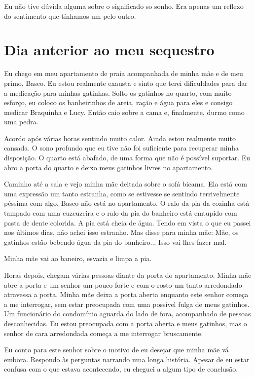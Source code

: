 \documentclass[11pt]{book}
\begin{document}
Eu não tive dúvida alguma sobre o significado so sonho. Era apenas um reflexo do sentimento que tínhamos um pelo outro.

\chapter{Dia anterior ao meu sequestro}

Eu chego em meu apartamento de praia acompanhada de minha mãe e de meu primo, Basco. Eu estou realmente exausta e sinto que terei dificuldades para dar a medicação para minhas gatinhas. Solto os gatinhos no quarto, com muito esforço, eu coloco os banheirinhos de areia, ração e água para eles e consigo medicar Braquinha e Lucy. Então caio sobre a cama e, finalmente, durmo como uma pedra.

Acordo após várias horas sentindo muito calor. Ainda estou realmente muito cansada. O sono profundo que eu tive não foi suficiente para recuperar minha disposição. O quarto está abafado, de uma forma que não é possível suportar. Eu abro a porta do quarto e deixo meus gatinhos livres no apartamento. 

Caminho até a sala e vejo minha mãe deitada sobre o sofá bicama. Ela está com uma expressão um tanto estranha, como se estivesse se sentindo terrivelmente péssima com algo. Basco não está no apartamento. O ralo da pia da cozinha está tampado com uma cuzcuzeira e o ralo da pia do banheiro está emtupido com pasta de dente colorida. A pia está cheia de água. Tendo em vista o que eu passei nos últimos dias, não achei isso estranho. Mas disse para minha mãe: Mãe, os gatinhos estão bebendo água da pia do banheiro... Isso vai lhes fazer mal. 

Minha mãe vai ao baneiro, esvazia e limpa a pia.

Horas depois, chegam várias pessoas diante da porta do apartamento. Minha mãe abre a porta e um senhor um pouco forte e com o rosto um tanto arredondado atravessa a porta. Minha mãe deixa a porta aberta enquanto este senhor começa a me interrogar, sem estar preocupada com uma possível fulga de meus gatinhos. Um funcionário do condomínio aguarda do lado de fora, acompanhado de pessoas desconhecidas. Eu estou preocupada com a porta aberta e meus gatinhos, mas o senhor de cara arredondada começa a me interrogar bruscamente.

Eu conto para este senhor sobre o motivo de eu desejar que minha mãe vá embora. Respondo às perguntas narrando uma longa história. Apesar de eu estar confusa com o que estava acontecendo, eu cheguei a algum tipo de conclusão. 
\end{document}
